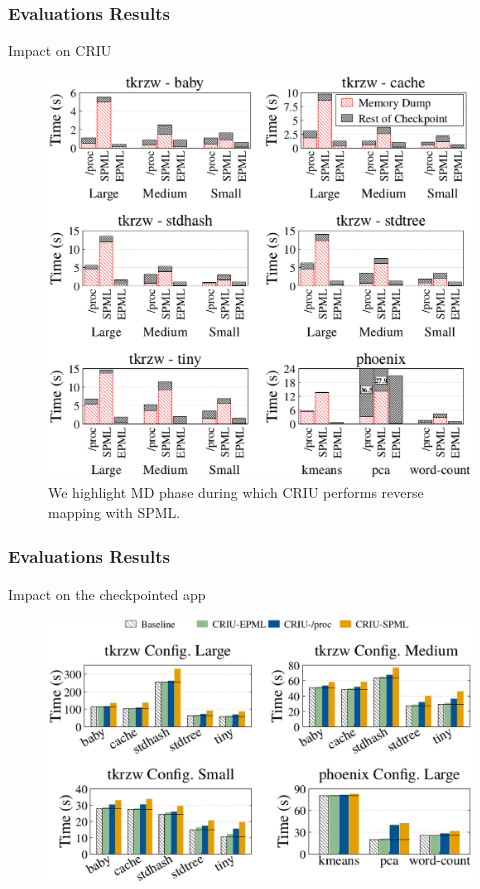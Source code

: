 \documentclass[xcolor=table,bigger,unknownkeysallowed]{beamer}
\begin{document}
        \begin{frame}
			\thispagestyle{empty}
			\frametitle{Evaluations Results}
			\begin{block}{Impact on CRIU}
				\begin{figure}[!htp]
					\centering 
					\includegraphics[width=.45\linewidth]{fig/criu-results-tracker}
					\caption{\scriptsize We highlight MD phase during which CRIU performs reverse mapping with SPML.}
					\label{fig:criu-results-tracker}
				\end{figure}											
			\end{block}
        \end{frame}        
        \begin{frame}
			\frametitle{Evaluations Results}
			\begin{block}{Impact on the checkpointed app}
				\begin{figure}[!h]
					\centering 
					\includegraphics[width=.6\linewidth]{fig/criu-results-tracked}
				\end{figure}										
			\end{block}
        \end{frame}         
\end{document}
